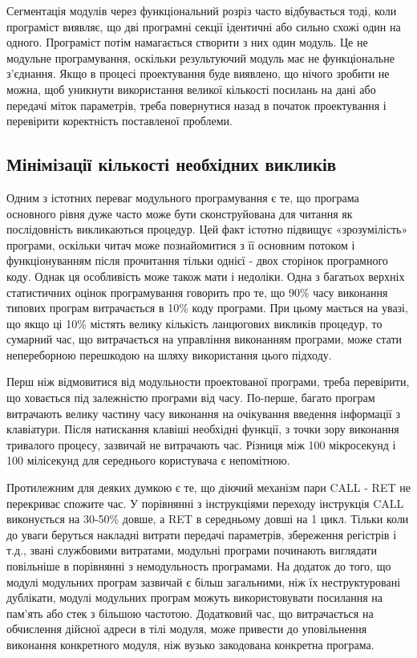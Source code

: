 \documentclass[a4paper,14pt, titlepage]{article}
\begin{document}
Сегментація модулів через функціональний розріз часто відбувається тоді,
коли програміст виявляє, що дві програмні секції ідентичні або сильно
схожі один на одного. Програміст потім намагається створити з них один
модуль. Це не модульне програмування, оскільки результуючий модуль має
не функціональне з'єднання. Якщо в процесі проектування буде виявлено,
що нічого зробити не можна, щоб уникнути використання великої кількості
посилань на дані або передачі міток параметрів, треба повернутися назад
в початок проектування і перевірити коректність поставленої проблеми.

\subsection{Мінімізації кількості необхідних викликів}

Одним з істотних переваг модульного програмування є те, що програма
основного рівня дуже часто може бути сконструйована для читання як
послідовність викликаються процедур. Цей факт істотно підвищує
«зрозумілість» програми, оскільки читач може познайомитися з її основним
потоком і функціонуванням після прочитання тільки однієї - двох сторінок
програмного коду. Однак ця особливість може також мати і недоліки. Одна
з багатьох верхніх статистичних оцінок програмування говорить про те, що
90\% часу виконання типових програм витрачається в 10\% коду програми.
При цьому мається на увазі, що якщо ці 10\% містять велику кількість
ланцюгових викликів процедур, то сумарний час, що витрачається на
управління виконанням програми, може стати непереборною перешкодою на
шляху використання цього підходу.

Перш ніж відмовитися від модульности проектованої програми, треба
перевірити, що ховається під залежністю програми від часу. По-перше,
багато програм витрачають велику частину часу виконання на очікування
введення інформації з клавіатури. Після натискання клавіші необхідні
функції, з точки зору виконання тривалого процесу, зазвичай не
витрачають час. Різниця між 100 мікросекунд і 100 мілісекунд для
середнього користувача є непомітною.

Протилежним для деяких думкою є те, що діючий механізм пари CALL - RET
не перекриває спожите час. У порівнянні з інструкціями переходу
інструкція CALL виконується на 30-50\% довше, а RET в середньому довші
на 1 цикл. Тільки коли до уваги беруться накладні витрати передачі
параметрів, збереження регістрів і т.д., звані службовими витратами,
модульні програми починають виглядати повільніше в порівнянні з
немодульность програмами. На додаток до того, що модулі модульних
програм зазвичай є більш загальними, ніж їх неструктуровані дублікати,
модулі модульних програм можуть використовувати посилання на пам'ять або
стек з більшою частотою. Додатковий час, що витрачається на обчислення
дійсної адреси в тілі модуля, може привести до уповільнення виконання
конкретного модуля, ніж вузько закодована конкретна програма.
\end{document}
